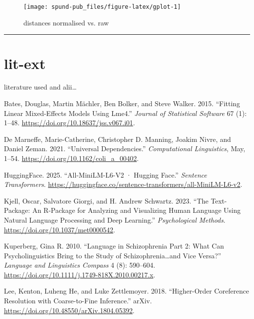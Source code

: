 \documentclass[
  12pt,
  oneside]{book}
\newlength{\cslhangindent}
\newenvironment{CSLReferences}[2] %
 {\begin{list}{}{%
  \setlength{\itemindent}{0pt}
  \setlength{\leftmargin}{0pt}
  \setlength{\parsep}{0pt}
  \ifodd #1
   \setlength{\leftmargin}{\cslhangindent}
   \setlength{\itemindent}{-1\cslhangindent}
  \fi
  \setlength{\itemsep}{#2\baselineskip}}}
 {\end{list}}
\begin{document}
\begin{figure}[H]
\texttt{[image: spund-pub\_files/figure-latex/gplot-1]} \caption{distances normalised vs. raw}\label{fig:gplot}
\end{figure}

\begin{center}\rule{0.5\linewidth}{0.5pt}\end{center}

\section{lit-ext}\label{lit-ext}

literature used and alii\ldots{}

\label{refs}
\begin{CSLReferences}{1}{0}
Bates, Douglas, Martin Mächler, Ben Bolker, and Steve Walker. 2015. {``Fitting {Linear} {Mixed}-{Effects} {Models} {Using} Lme4.''} \emph{Journal of Statistical Software} 67 (1): 1--48. \url{https://doi.org/10.18637/jss.v067.i01}.

De Marneffe, Marie-Catherine, Christopher D. Manning, Joakim Nivre, and Daniel Zeman. 2021. {``Universal {Dependencies}.''} \emph{Computational Linguistics}, May, 1--54. \url{https://doi.org/10.1162/coli_a_00402}.

HuggingFace. 2025. {``All-{MiniLM}-{L6}-V2 · {Hugging} {Face}.''} \emph{Sentence Transformers}. \url{https://huggingface.co/sentence-transformers/all-MiniLM-L6-v2}.

Kjell, Oscar, Salvatore Giorgi, and H. Andrew Schwartz. 2023. {``The Text-Package: {An} {R}-Package for {Analyzing} and {Visualizing} {Human} {Language} {Using} {Natural} {Language} {Processing} and {Deep} {Learning}.''} \emph{Psychological Methods}. \url{https://doi.org/10.1037/met0000542}.

Kuperberg, Gina R. 2010. {``Language in Schizophrenia {Part} 2: {What} Can Psycholinguistics Bring to the Study of Schizophrenia\ldots and Vice Versa?''} \emph{Language and Linguistics Compass} 4 (8): 590--604. \url{https://doi.org/10.1111/j.1749-818X.2010.00217.x}.

Lee, Kenton, Luheng He, and Luke Zettlemoyer. 2018. {``Higher-Order {Coreference} {Resolution} with {Coarse}-to-Fine {Inference}.''} arXiv. \url{https://doi.org/10.48550/arXiv.1804.05392}.


\end{CSLReferences}
\end{document}
